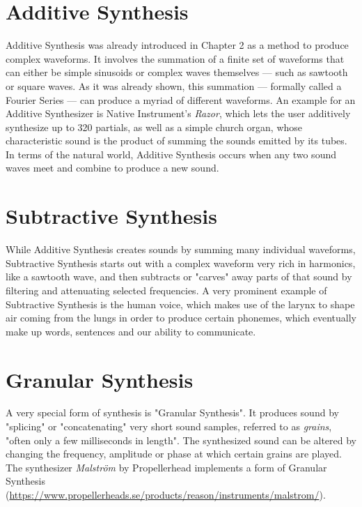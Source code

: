 \documentclass[12pt,twoside]{report}
\begin{document}
\section{Additive Synthesis}

Additive Synthesis was already introduced in Chapter 2 as a method to produce complex waveforms. It involves the summation of a finite set of waveforms that can either be simple sinusoids or complex waves themselves --- such as sawtooth or square waves. As it was already shown, this summation --- formally called a Fourier Series --- can produce a myriad of different waveforms. An example for an Additive Synthesizer is Native Instrument's \emph{Razor}, which lets the user additively synthesize up to 320 partials, as well as a simple church organ, whose characteristic sound is the product of summing the sounds emitted by its tubes. In terms of the natural world, Additive Synthesis occurs when any two sound waves meet and combine to produce a new sound.

\section{Subtractive Synthesis}

While Additive Synthesis creates sounds by summing many individual waveforms, Subtractive Synthesis starts out with a complex waveform very rich in harmonics, like a sawtooth wave, and then subtracts or "carves" away parts of that sound by filtering and attenuating selected frequencies. A very prominent example of Subtractive Synthesis is the human voice, which makes use of the larynx to shape air coming from the lungs in order to produce certain phonemes, which eventually make up words, sentences and our ability to communicate.

\section{Granular Synthesis}

A very special form of synthesis is "Granular Synthesis". It produces sound by "splicing" or "concatenating" very short sound samples, referred to as \emph{grains}, "often only a few milliseconds in length".  The synthesized sound can be altered by changing the frequency, amplitude or phase at which certain grains are played. The synthesizer \emph{Malström} by Propellerhead implements a form of Granular Synthesis (\url{https://www.propellerheads.se/products/reason/instruments/malstrom/}).
\end{document}
